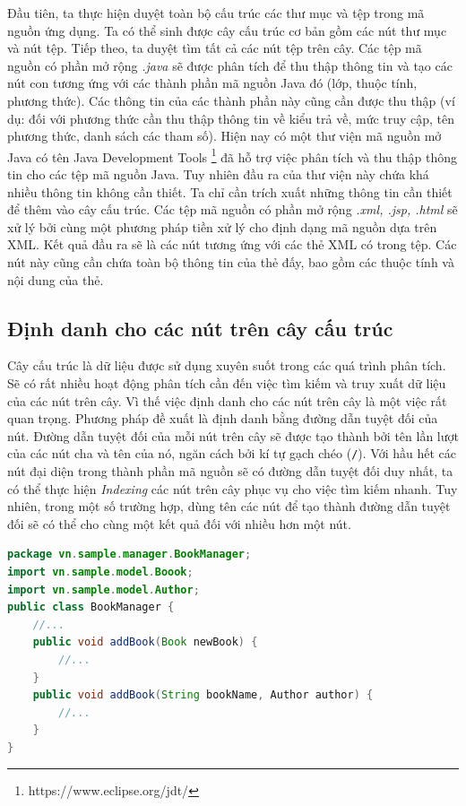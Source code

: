 \documentclass[12pt,a4paper]{report}
\begin{document}
Đầu tiên, ta thực hiện duyệt toàn bộ cấu trúc các thư mục và tệp trong mã nguồn ứng dụng. Ta có thể sinh được cây cấu trúc cơ bản gồm các nút thư mục và nút tệp. Tiếp theo, ta duyệt tìm tất cả các nút tệp trên cây. Các tệp mã nguồn có phần mở rộng \textit{.java} sẽ được phân tích  để thu thập thông tin và tạo các nút con tương ứng với các thành phần mã nguồn Java đó (lớp, thuộc tính, phương thức). Các thông tin của các thành phần này cũng cần được thu thập (ví dụ: đối với phương thức cần thu thập thông tin về kiểu trả về, mức truy cập, tên phương thức, danh sách các tham số). Hiện nay có một thư viện mã nguồn mở Java có tên Java Development Tools \footnote{https://www.eclipse.org/jdt/} đã hỗ trợ việc phân tích và thu thập thông tin cho các tệp mã nguồn Java. Tuy nhiên đầu ra của thư viện này chứa khá nhiều thông tin không cần thiết. Ta chỉ cần trích xuất những thông tin cần thiết để thêm vào cây cấu trúc. Các tệp mã nguồn có phần mở rộng \textit{.xml, .jsp, .html} sẽ xử lý bởi cùng một phương pháp tiền xử lý cho định dạng mã nguồn dựa trên XML. Kết quả đầu ra sẽ là các nút tương ứng với các thẻ XML có trong tệp. Các nút này cũng cần chứa toàn bộ thông tin của thẻ đấy, bao gồm các thuộc tính và nội dung của thẻ.\\

\subsection{Định danh cho các nút trên cây cấu trúc}
Cây cấu trúc là dữ liệu được sử dụng xuyên suốt trong các quá trình phân tích. Sẽ có rất nhiều hoạt động phân tích cần đến việc tìm kiếm và truy xuất dữ liệu của các nút trên cây. Vì thế việc định danh cho các nút trên cây là một việc rất quan trọng. Phương pháp đề xuất là định danh bằng đường dẫn tuyệt đối của nút. Đường dẫn tuyệt đối của mỗi nút trên cây sẽ được tạo thành bởi tên lần lượt của các nút cha và tên của nó, ngăn cách bởi kí tự gạch chéo (\texttt{/}). Với hầu hết các nút đại diện trong thành phần mã nguồn sẽ có đường dẫn tuyệt đối duy nhất, ta có thể thực hiện \textit{Indexing} các nút trên cây phục vụ cho việc tìm kiếm nhanh. Tuy nhiên, trong một số trường hợp, dùng tên các nút để tạo thành đường dẫn tuyệt đối sẽ có thể cho cùng một kết quả đối với nhiều hơn một nút.\\

\begin{lstlisting}[language=Java,
caption={Ví dụ chồng hàm trong Java},label={code:java-overloading}]
package vn.sample.manager.BookManager;
import vn.sample.model.Boook;
import vn.sample.model.Author;
public class BookManager {
	//...	
	public void addBook(Book newBook) {
		//...
	}
	public void addBook(String bookName, Author author) {
		//...
	}
}
\end{lstlisting}
\end{document}

